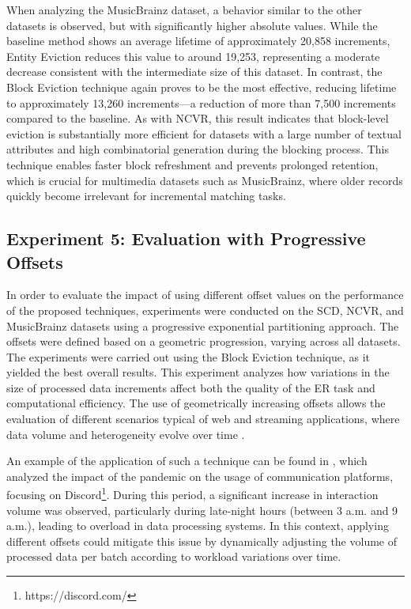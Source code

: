 \documentclass{ieeeaccess}
\begin{document}
When analyzing the MusicBrainz dataset, a behavior similar to the other datasets is observed, but with significantly higher absolute values. While the baseline method shows an average lifetime of approximately 20,858 increments, Entity Eviction reduces this value to around 19,253, representing a moderate decrease consistent with the intermediate size of this dataset. In contrast, the Block Eviction technique again proves to be the most effective, reducing lifetime to approximately 13,260 increments—a reduction of more than 7,500 increments compared to the baseline. As with NCVR, this result indicates that block-level eviction is substantially more efficient for datasets with a large number of textual attributes and high combinatorial generation during the blocking process. This technique enables faster block refreshment and prevents prolonged retention, which is crucial for multimedia datasets such as MusicBrainz, where older records quickly become irrelevant for incremental matching tasks.


\subsection{Experiment 5: Evaluation with Progressive Offsets}

In order to evaluate the impact of using different offset values on the performance of the proposed techniques, experiments were conducted on the SCD, NCVR, and MusicBrainz datasets using a progressive exponential partitioning approach. The offsets were defined based on a geometric progression, varying across all datasets. The experiments were carried out using the Block Eviction technique, as it yielded the best overall results. This experiment analyzes how variations in the size of processed data increments affect both the quality of the ER task and computational efficiency. The use of geometrically increasing offsets allows the evaluation of different scenarios typical of web and streaming applications, where data volume and heterogeneity evolve over time \cite{ren2021online,hassani2019overview}.

An example of the application of such a technique can be found in \cite{webmedia}, which analyzed the impact of the pandemic on the usage of communication platforms, focusing on Discord\footnote{https://discord.com/}. During this period, a significant increase in interaction volume was observed, particularly during late-night hours (between 3 a.m. and 9 a.m.), leading to overload in data processing systems. In this context, applying different offsets could mitigate this issue by dynamically adjusting the volume of processed data per batch according to workload variations over time.
\end{document}
